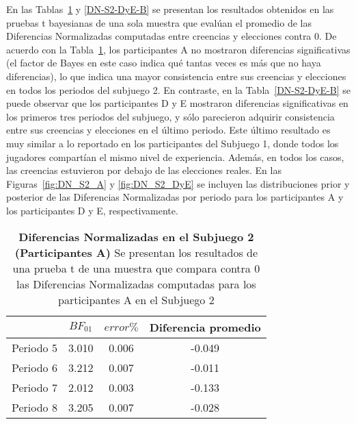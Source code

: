 En las Tablas~\ref{DN-S2-A-B} y \ref{DN-S2-DyE-B} se presentan los resultados obtenidos en las pruebas t bayesianas de una sola muestra que evalúan el promedio de las Diferencias Normalizadas computadas entre creencias y elecciones contra 0. De acuerdo con la Tabla~\ref{DN-S2-A-B}, los participantes A no mostraron diferencias significativas (el factor de Bayes en este caso indica qué tantas veces es más que no haya diferencias), lo que indica una mayor consistencia entre sus creencias y elecciones en todos los periodos del subjuego 2. En contraste, en la Tabla~\ref{DN-S2-DyE-B} se puede observar que los participantes D y E mostraron diferencias significativas en los primeros tres periodos del subjuego, y sólo parecieron  adquirir consistencia entre sus creencias y elecciones en el último periodo. Este último resultado es muy similar a lo reportado en los participantes del Subjuego 1, donde todos los jugadores compartían el mismo nivel de experiencia. Además, en todos los casos, las creencias estuvieron por debajo de las elecciones reales. En las Figuras~\ref{fig:DN_S2_A} y \ref{fig:DN_S2_DyE} se incluyen las distribuciones prior y posterior de las Diferencias Normalizadas por periodo para los participantes A y los participantes D y E, respectivamente.\\ 

\begin{table}[h]
\caption[Diferencias Normalizadas en el Subjuego 2; Participante A (Pruebas t de una muestra)]{\textbf{Diferencias Normalizadas en el Subjuego 2 (Participantes A)} Se presentan los resultados de una prueba t de una muestra que compara contra 0 las Diferencias Normalizadas computadas para los participantes A en el Subjuego 2}
\label{DN-S2-A-B}
\centering
\begin{tabular}{l | c c | c}
\toprule
\textbf{} & \textbf{$BF_{01}$} & \textbf{$error\%$} & \textbf{Diferencia promedio}\\
\midrule
Periodo 5 & 3.010 & 0.006 & -0.049\\
Periodo 6 & 3.212 & 0.007 & -0.011\\
Periodo 7 & 2.012 & 0.003 & -0.133\\
Periodo 8 & 3.205 & 0.007 & -0.028\\
\bottomrule
\end{tabular}
\end{table}

